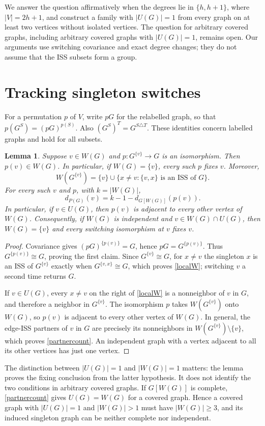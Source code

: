 \documentclass[11pt]{article}
\newtheorem{lemma}[theorem]{Lemma}
\begin{document}
We answer the question affirmatively when the degrees lie in
$\{h,h+1\}$, where $|V|=2h+1$, and construct a family with $|U(G)|=1$
from every graph on at least two vertices without isolated vertices.
The question for arbitrary
covered graphs, including arbitrary covered graphs with $|U(G)|=1$,
remains open. Our arguments use switching covariance and exact degree
changes; they do not assume that the ISS subsets form a group.

\section{Tracking singleton switches}
For a permutation $p$ of $V$, write $pG$ for the relabelled graph, so that
$p(G^S)=(pG)^{p(S)}$. Also $(G^S)^T=G^{S\triangle T}$.
These identities concern labelled graphs and hold for all subsets.

\begin{lemma}\label{transport}
Suppose $v\in W(G)$ and $p:G^{\{v\}}\to G$ is an isomorphism. Then
$p(v)\in W(G)$. In particular, if $W(G)=\{v\}$, every such $p$ fixes $v$.
Moreover,
\begin{equation}\label{localW}
 W(G^{\{v\}})=\{v\}\cup
 \{x\ne v:\{v,x\}\text{ is an ISS of }G\}.
\end{equation}
For every such $v$ and $p$, with $k=|W(G)|$,
\begin{equation}\label{partnercount}
 d_{P(G)}(v)=k-1-d_{G[W(G)]}(p(v)).
\end{equation}
In particular, if $v\in U(G)$, then $p(v)$ is adjacent to every other
vertex of $W(G)$. Consequently, if $W(G)$ is independent and $v\in W(G)\cap U(G)$, then
$W(G)=\{v\}$ and every switching isomorphism at $v$ fixes $v$.
\end{lemma}
\begin{proof}
Covariance gives $(pG)^{\{p(v)\}}=G$, hence
$pG=G^{\{p(v)\}}$. Thus $G^{\{p(v)\}}\cong G$, proving the first claim.
Since $G^{\{v\}}\cong G$, for $x\ne v$ the singleton $x$ is an ISS
of $G^{\{v\}}$ exactly when $G^{\{v,x\}}\cong G$, which proves
\eqref{localW}; switching $v$ a second time returns $G$.

If $v\in U(G)$, every $x\ne v$ on the right of \eqref{localW} is a
nonneighbor of $v$ in $G$, and therefore a neighbor in $G^{\{v\}}$.
The isomorphism $p$ takes $W(G^{\{v\}})$ onto $W(G)$, so $p(v)$ is
adjacent to every other vertex of $W(G)$. In general, the edge-ISS
partners of $v$ in $G$ are precisely its nonneighbors in
$W(G^{\{v\}})\setminus\{v\}$, which proves \eqref{partnercount}.
An independent graph with a
vertex adjacent to all its other vertices has just one vertex.
\end{proof}
The distinction between $|U(G)|=1$ and $|W(G)|=1$ matters: the lemma
proves the fixing conclusion from the latter hypothesis. It does not
identify the two conditions in arbitrary covered graphs.
If $G[W(G)]$ is complete, \eqref{partnercount} gives $U(G)=W(G)$
for a covered graph. Hence a covered graph with $|U(G)|=1$ and
$|W(G)|>1$ must have $|W(G)|\geq3$, and its induced singleton graph
can be neither complete nor independent.
\end{document}
